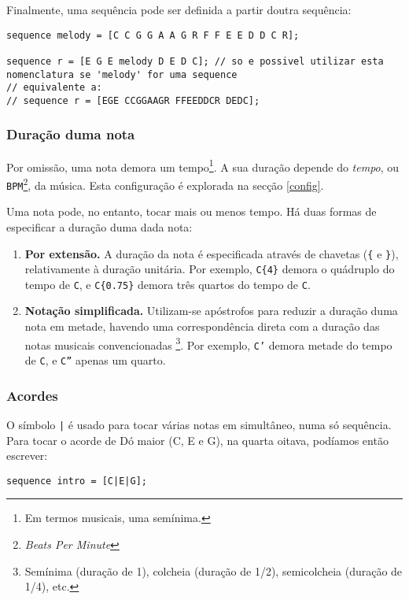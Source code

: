 \documentclass{article}
\begin{document}
Finalmente, uma sequência pode ser definida a partir doutra sequência:
\begin{lstlisting} 
sequence melody = [C C G G A A G R F F E E D D C R];

sequence r = [E G E melody D E D C]; // so e possivel utilizar esta nomenclatura se 'melody' for uma sequence
// equivalente a:
// sequence r = [EGE CCGGAAGR FFEEDDCR DEDC];
\end{lstlisting}


\subsubsection{Duração duma nota}
Por omissão, uma nota demora um tempo\footnote{Em termos musicais, uma semínima.}. A sua duração depende do \textit{tempo}, ou \texttt{BPM}\footnote{\textit{Beats Per Minute}}, da música. Esta configuração é explorada na secção \ref{config}.

Uma nota pode, no entanto, tocar mais ou menos tempo. Há duas formas de especificar a duração duma dada nota:
\begin{enumerate}
    \item \textbf{Por extensão.} A duração da nota é especificada através de chavetas (\texttt{\{} e \texttt{\}}), relativamente à duração unitária. Por exemplo, \texttt{C\{4\}} demora o quádruplo do tempo de \texttt{C}, e \texttt{C\{0.75\}} demora três quartos do tempo de \texttt{C}.
    \item \textbf{Notação simplificada.} Utilizam-se apóstrofos para reduzir a duração duma nota em metade, havendo uma correspondência direta com a duração das notas musicais convencionadas
    \footnote{Semínima (duração de 1), colcheia (duração de 1/2), semicolcheia (duração de 1/4), etc.}. 
    Por exemplo, \texttt{C'} demora metade do tempo de \texttt{C}, e \texttt{C''} apenas um quarto. 
\end{enumerate}

\subsubsection{Acordes}
O símbolo \texttt{|} é usado para tocar várias notas em simultâneo, numa só sequência.
Para tocar o acorde de Dó maior (C, E e G), na quarta oitava, podíamos então escrever:
\begin{lstlisting} 
sequence intro = [C|E|G];
\end{lstlisting}
\end{document}
